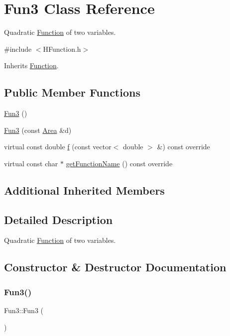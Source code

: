 \hypertarget{class_fun3}{}\section{Fun3 Class Reference}
\label{class_fun3}


Quadratic \hyperlink{class_function}{Function} of two variables.  




{\ttfamily \#include $<$H\+Function.\+h$>$}



Inherits \hyperlink{class_function}{Function}.

\subsection*{Public Member Functions}
\begin{DoxyCompactItemize}
\item 
\hyperlink{class_fun3_ab816f6a365c2161d72f255e442b2e5eb}{Fun3} ()
\item 
\hyperlink{class_fun3_a2c433a4d650aec03b2d42bb86d6ca969}{Fun3} (const \hyperlink{class_area}{Area} \&d)
\item 
virtual const double \hyperlink{class_fun3_ad0ed4dd48ce5107560db42959f57f1f5}{f} (const vector$<$ double $>$ \&) const override
\item 
virtual const char $\ast$ \hyperlink{class_fun3_a512d64bca04226bb354d8a7505794277}{get\+Function\+Name} () const override
\end{DoxyCompactItemize}
\subsection*{Additional Inherited Members}


\subsection{Detailed Description}
Quadratic \hyperlink{class_function}{Function} of two variables. 

\subsection{Constructor \& Destructor Documentation}
\mbox{\label{class_fun3_ab816f6a365c2161d72f255e442b2e5eb}} 
\subsubsection{\texorpdfstring{Fun3()}{Fun3()}\hspace{0.1cm}{\footnotesize\ttfamily [1/2]}}
{\footnotesize\ttfamily Fun3\+::\+Fun3 (\begin{DoxyParamCaption}{ }\end{DoxyParamCaption})}

